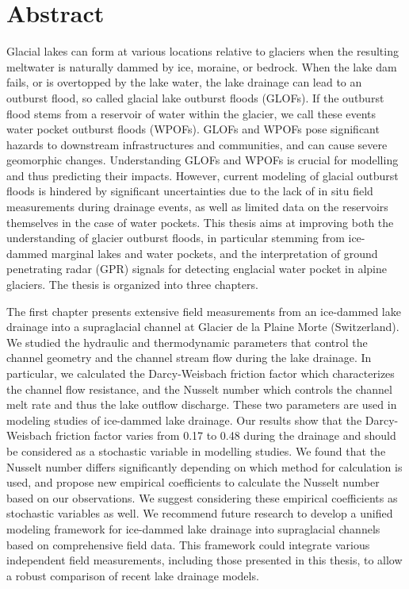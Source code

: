 \begingroup
\let\clearpage\relax
\let\cleardoublepage\relax
\let\cleardoublepage\relax

\chapter*{Abstract}


Glacial lakes can form at various locations relative to glaciers when the resulting meltwater is naturally dammed by ice, moraine, or bedrock. When the lake dam fails, or is overtopped by the lake water, the lake drainage can lead to an outburst flood, so called glacial lake outburst floods (GLOFs). If the outburst flood stems from a reservoir of water within the glacier, we call these events water pocket outburst floods (WPOFs). GLOFs and WPOFs pose significant hazards to downstream infrastructures and communities, and can cause severe geomorphic changes. Understanding GLOFs and WPOFs is crucial for modelling and thus predicting their impacts. However, current modeling of glacial outburst floods is hindered by significant uncertainties due to the lack of in situ field measurements during drainage events, as well as limited data on the reservoirs themselves in the case of water pockets. This thesis aims at improving both the understanding of glacier outburst floods, in particular stemming from ice-dammed marginal lakes and water pockets, and the interpretation of ground penetrating radar (GPR) signals for detecting englacial water pocket in alpine glaciers. The thesis is organized into three chapters.
%

The first chapter presents extensive field measurements from an ice-dammed lake drainage into a supraglacial channel at Glacier de la Plaine Morte (Switzerland). We studied the hydraulic and thermodynamic parameters that control the channel geometry and the channel stream flow during the lake drainage. In particular, we calculated the Darcy-Weisbach friction factor which characterizes the channel flow resistance, and the Nusselt number which controls the channel melt rate and thus the lake outflow discharge. These two parameters are used in modeling studies of ice-dammed lake drainage. Our results show that the Darcy-Weisbach friction factor varies from 0.17 to 0.48 during the drainage and should be considered as a stochastic variable in modelling studies. We found that the Nusselt number differs significantly depending on which method for calculation is used, and propose new empirical coefficients to calculate the Nusselt number based on our observations. We suggest considering these empirical coefficients as stochastic variables as well. We recommend future research to develop a unified modeling framework for ice-dammed lake drainage into supraglacial channels based on comprehensive field data. This framework could integrate various independent field measurements, including those presented in this thesis, to allow a robust comparison of recent lake drainage models.
%


